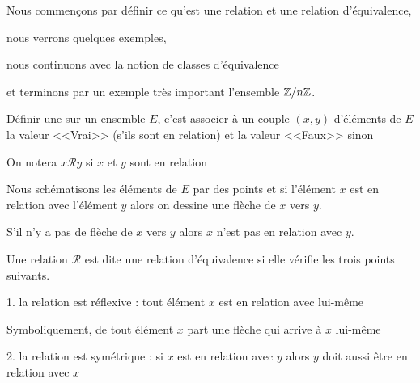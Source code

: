 





\debuttexte

\diapo

\change

\change

Nous commençons par définir ce qu'est une relation et une relation d'équivalence,

\change

nous verrons quelques exemples,

\change

nous continuons avec la notion de classes d'équivalence

\change

et terminons par un exemple très important l'ensemble $\mathbb{Z}/n\mathbb{Z}$.


\diapo


Définir une  sur un ensemble $E$, c'est associer à un couple 
$(x,y)$ d'éléments de $E$ la valeur <<Vrai>> (s'ils sont en relation) et la valeur <<Faux>> sinon

\change

On notera $x\mathcal{R}y$ si $x$ et $y$ sont en relation 

\change


Nous schématisons les éléments de $E$ par des points et si l'élément $x$ est en relation avec 
l'élément $y$ alors on dessine une flèche de $x$ vers $y$.

S'il n'y a pas de flèche de $x$ vers $y$ alors $x$ n'est pas en relation avec $y$.


\diapo

Une relation $\mathcal{R}$ est dite une relation d'équivalence si elle vérifie les trois points suivants.


1. la relation est réflexive : tout élément $x$ est en relation avec lui-même

\change

Symboliquement, de tout élément $x$ part une flèche qui arrive à $x$ lui-même

\change

2. la relation est symétrique : si $x$ est en relation avec $y$ alors $y$ doit aussi être en relation avec $x$

